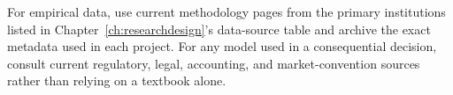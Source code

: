 For empirical data, use current methodology pages from the primary institutions
listed in Chapter~\ref{ch:researchdesign}'s data-source table and archive the exact metadata used
in each project. For any model used in a consequential decision, consult current
regulatory, legal, accounting, and market-convention sources rather than relying on a
textbook alone.
